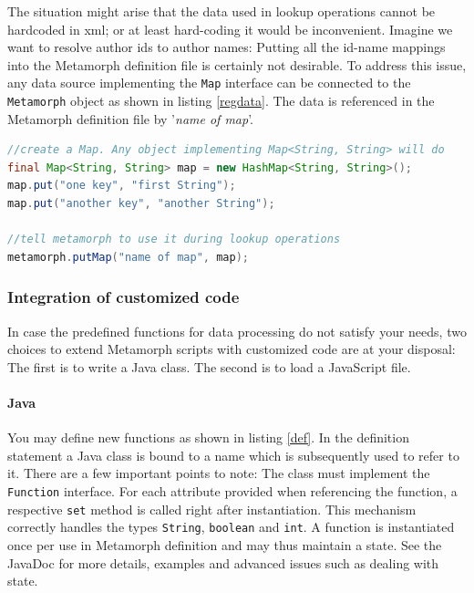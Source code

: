 \documentclass[12pt,a4paper]{article}
\begin{document}
The situation might arise that the data used in lookup operations cannot be hardcoded in xml; or at least hard-coding it would be inconvenient. Imagine we want to resolve author ids to author names: Putting all the id-name mappings into the Metamorph definition file is certainly not desirable.
To address this issue, any data source implementing the {\tt Map} interface can be connected to the {\tt Metamorph} object as shown in listing \ref{regdata}. The data is referenced in the Metamorph definition file by '{\it name of map}'.

\begin{lstlisting}[float=htb, label=regdata,caption= Registering a map with the metamorph object., language=Java]
//create a Map. Any object implementing Map<String, String> will do
final Map<String, String> map = new HashMap<String, String>();
map.put("one key", "first String");
map.put("another key", "another String");

//tell metamorph to use it during lookup operations
metamorph.putMap("name of map", map);
\end{lstlisting}



\subsubsection{Integration of customized code}\label{customfunc}

In case the predefined functions for data processing do not satisfy your needs, two choices to extend Metamorph scripts with customized code are at your disposal: The first is to write a Java class. The second is to load a JavaScript file.

\paragraph{Java}

You may define new functions as shown in listing \ref{def}. In the definition statement a Java class is bound to a name which is subsequently used to refer to it. There are a few important points to note:
The class must implement the {\tt Function} interface. For each attribute provided when referencing the function, a respective {\tt set} method is called right after instantiation. This mechanism correctly handles the types {\tt String}, {\tt boolean} and {\tt int}. A function is instantiated once per use in Metamorph definition and may thus maintain a state. See the JavaDoc for more details, examples and advanced issues such as dealing with state.
\end{document}
